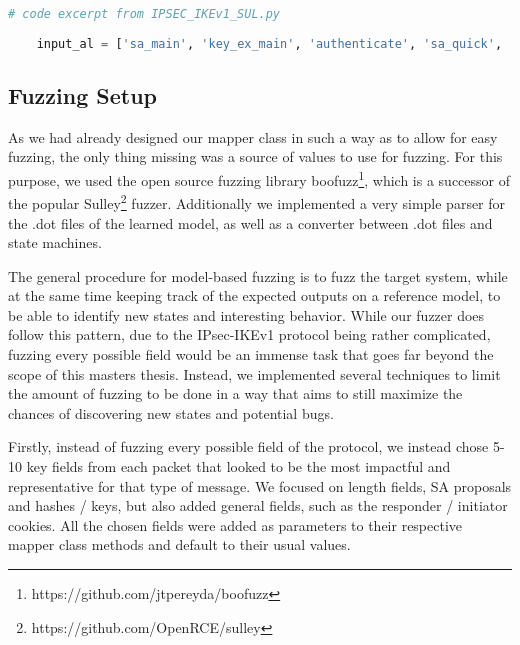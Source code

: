 \begin{lstlisting}[float=h, caption=The updated input Alphabet, label=lst:inputal_2, numbers=none, language=python]
	# code excerpt from IPSEC_IKEv1_SUL.py
	
	input_al = ['sa_main', 'key_ex_main', 'authenticate', 'sa_quick', 'ack_quick', 'sa_main_err', 'key_ex_main_err', 'authenticate_err', 'sa_quick_err', 'ack_quick_err']
\end{lstlisting}


\subsection{Fuzzing Setup} \label{subsec:fuzz_setup}
As we had already designed our mapper class in such a way as to allow for easy fuzzing, the only thing missing was a source of values to use for fuzzing. For this purpose, we used the open source fuzzing library boofuzz\footnote{https://github.com/jtpereyda/boofuzz}, which is a successor of the popular Sulley\footnote{https://github.com/OpenRCE/sulley} fuzzer. Additionally we implemented a very simple parser for the .dot files of the learned model, as well as a converter between .dot files and state machines.

The general procedure for model-based fuzzing is to fuzz the target system, while at the same time keeping track of the expected outputs on a reference model, to be able to identify new states and interesting behavior. While our fuzzer does follow this pattern, due to the IPsec-IKEv1 protocol being rather complicated, fuzzing every possible field would be an immense task that goes far beyond the scope of this masters thesis. Instead, we implemented several techniques to limit the amount of fuzzing to be done in a way that aims to still maximize the chances of discovering new states and potential bugs. 

Firstly, instead of fuzzing every possible field of the protocol, we instead chose 5-10 key fields from each packet that looked to be the most impactful and representative for that type of message. We focused on length fields, SA proposals and hashes / keys, but also added general fields, such as the responder / initiator cookies. All the chosen fields were added as parameters to their respective mapper class methods and default to their usual values. 

